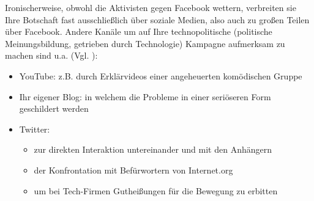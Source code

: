\documentclass{article}
\begin{document}
Ironischerweise, obwohl die Aktivisten gegen Facebook wettern, verbreiten sie Ihre Botschaft fast ausschließlich über soziale Medien, also auch zu großen Teilen über Facebook. Andere Kanäle um auf Ihre technopolitische (politische Meinungsbildung, getrieben durch Technologie) Kampagne aufmerksam zu machen sind u.a. (Vgl. \cite{prasad2017}):
\begin{itemize}
  \item YouTube: z.B. durch Erklärvideos einer angeheuerten komödischen Gruppe
  \item Ihr eigener Blog: in welchem die Probleme in einer seriöseren Form geschildert werden
  \item Twitter:
    \begin{itemize}
      \item zur direkten Interaktion untereinander und mit den Anhängern
      \item der Konfrontation mit Befürwortern von Internet.org
      \item um bei Tech-Firmen Gutheißungen für die Bewegung zu erbitten
    \end{itemize}
\end{itemize}

\end{document}

